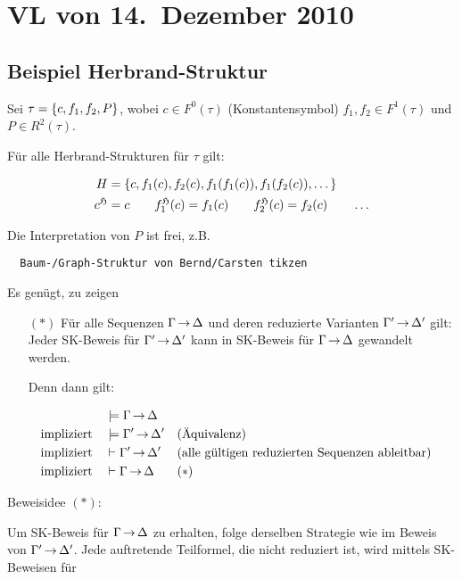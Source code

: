 \section{VL von 14.~Dezember 2010}

\subsection{Beispiel Herbrand-Struktur}

Sei $\tau = \left\{c, f_1, f_2, P\right\}$, wobei $c\in F^0(\tau)$ (Konstantensymbol)
$f_1,f_2 \in F^1(\tau)$ und $P \in R^2(\tau)$.

Für alle Herbrand-Strukturen für $\tau$ gilt:

\begin{align*}
  H &= \left\{c, f_1(c), f_2(c), f_1(f_1(c)), f_1(f_2(c)), \dots\right\} \\
  c^{\mathfrak{H}} &= c \qquad f_1^{\mathfrak{H}}(c) = f_1(c) \qquad f_2^{\mathfrak{H}}(c) = f_2(c) \qquad \dots
\end{align*}

Die Interpretation von $P$ ist frei, z.B.

\begin{verbatim}
  Baum-/Graph-Struktur von Bernd/Carsten tikzen
\end{verbatim}

Es genügt, zu zeigen

\begin{itemize}
  \item[$(*)$] Für alle Sequenzen $\Gamma\operatorname{\rightarrow}\Delta$ und deren reduzierte Varianten
  $\Gamma'\operatorname{\rightarrow}\Delta'$ gilt: Jeder SK-Beweis für $\Gamma'\operatorname{\rightarrow}\Delta'$ kann in SK-Beweis
  für $\Gamma\operatorname{\rightarrow}\Delta$ gewandelt werden.
  
  Denn dann gilt:
  
  \begin{align*}
                            &\models\Gamma \operatorname{\rightarrow}\Delta \\
    \text{impliziert} \quad &\models\Gamma'\operatorname{\rightarrow}\Delta' && \text{(Äquivalenz)} \\
    \text{impliziert} \quad &\vdash \Gamma'\operatorname{\rightarrow}\Delta' && \text{(alle gültigen reduzierten Sequenzen ableitbar)} \\
    \text{impliziert} \quad &\vdash \Gamma \operatorname{\rightarrow}\Delta  && (*)
  \end{align*}
\end{itemize}

Beweisidee $(*)$:

Um SK-Beweis für $\Gamma\operatorname{\rightarrow}\Delta$ zu erhalten, folge derselben Strategie wie im
Beweis von $\Gamma'\operatorname{\rightarrow}\Delta'$. Jede auftretende Teilformel, die nicht reduziert
ist, wird mittels SK-Beweisen für

